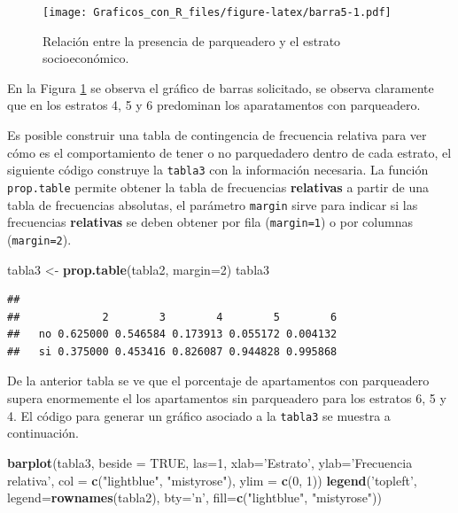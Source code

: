 \documentclass[10pt,]{krantz}
\makeatletter
\newenvironment{Shaded}{\begin{snugshade}}{\end{snugshade}}
\newcommand{\KeywordTok}[1]{\textcolor[rgb]{0.13,0.29,0.53}{\textbf{{#1}}}}
\newcommand{\DataTypeTok}[1]{\textcolor[rgb]{0.13,0.29,0.53}{{#1}}}
\newcommand{\DecValTok}[1]{\textcolor[rgb]{0.00,0.00,0.81}{{#1}}}
\newcommand{\StringTok}[1]{\textcolor[rgb]{0.31,0.60,0.02}{{#1}}}
\newcommand{\OtherTok}[1]{\textcolor[rgb]{0.56,0.35,0.01}{{#1}}}
\newcommand{\NormalTok}[1]{{#1}}
\newenvironment{kframe}{%
\medskip{}
\setlength{\fboxsep}{.8em}
 \def\at@end@of@kframe{}%
 \ifinner\ifhmode%
  \def\at@end@of@kframe{\end{minipage}}%
  \begin{minipage}{\columnwidth}%
 \fi\fi%
 \def\FrameCommand##1{\hskip\@totalleftmargin \hskip-\fboxsep
 \colorbox{shadecolor}{##1}\hskip-\fboxsep
     \hskip-\linewidth \hskip-\@totalleftmargin \hskip\columnwidth}%
 \MakeFramed {\advance\hsize-\width
   \@totalleftmargin\z@ \linewidth\hsize
   \@setminipage}}%
 {\par\unskip\endMakeFramed%
 \at@end@of@kframe}
\renewenvironment{Shaded}{\begin{kframe}}{\end{kframe}}
\makeatother
\begin{document}
\begin{figure}[htbp]
\centering
\texttt{[image: Graficos\_con\_R\_files/figure-latex/barra5-1.pdf]}
\caption{\label{fig:barra5}Relación entre la presencia de parqueadero y el
estrato socioeconómico.}
\end{figure}

En la Figura \ref{fig:barra5} se observa el gráfico de barras
solicitado, se observa claramente que en los estratos 4, 5 y 6
predominan los aparatamentos con parqueadero.

Es posible construir una tabla de contingencia de frecuencia relativa
para ver cómo es el comportamiento de tener o no parquedadero dentro de
cada estrato, el siguiente código construye la \texttt{tabla3} con la
información necesaria. La función \texttt{prop.table} permite obtener la
tabla de frecuencias \textbf{relativas} a partir de una tabla de
frecuencias absolutas, el parámetro \texttt{margin} sirve para indicar
si las frecuencias \textbf{relativas} se deben obtener por fila
(\texttt{margin=1}) o por columnas (\texttt{margin=2}).

\begin{Shaded}
\begin{Highlighting}[]
\NormalTok{tabla3 <-}\StringTok{ }\KeywordTok{prop.table}\NormalTok{(tabla2, }\DataTypeTok{margin=}\DecValTok{2}\NormalTok{)}
\NormalTok{tabla3}
\end{Highlighting}
\end{Shaded}

\begin{verbatim}
##     
##             2        3        4        5        6
##   no 0.625000 0.546584 0.173913 0.055172 0.004132
##   si 0.375000 0.453416 0.826087 0.944828 0.995868
\end{verbatim}

De la anterior tabla se ve que el porcentaje de apartamentos con
parqueadero supera enormemente el los apartamentos sin parqueadero para
los estratos 6, 5 y 4. El código para generar un gráfico asociado a la
\texttt{tabla3} se muestra a continuación.

\begin{Shaded}
\begin{Highlighting}[]
\KeywordTok{barplot}\NormalTok{(tabla3, }
        \DataTypeTok{beside =} \OtherTok{TRUE}\NormalTok{, }\DataTypeTok{las=}\DecValTok{1}\NormalTok{, }
        \DataTypeTok{xlab=}\StringTok{'Estrato'}\NormalTok{, }\DataTypeTok{ylab=}\StringTok{'Frecuencia relativa'}\NormalTok{,}
        \DataTypeTok{col =} \KeywordTok{c}\NormalTok{(}\StringTok{"lightblue"}\NormalTok{, }\StringTok{"mistyrose"}\NormalTok{),}
        \DataTypeTok{ylim =} \KeywordTok{c}\NormalTok{(}\DecValTok{0}\NormalTok{, }\DecValTok{1}\NormalTok{))}
\KeywordTok{legend}\NormalTok{(}\StringTok{'topleft'}\NormalTok{, }\DataTypeTok{legend=}\KeywordTok{rownames}\NormalTok{(tabla2), }\DataTypeTok{bty=}\StringTok{'n'}\NormalTok{,}
       \DataTypeTok{fill=}\KeywordTok{c}\NormalTok{(}\StringTok{"lightblue"}\NormalTok{, }\StringTok{"mistyrose"}\NormalTok{))}
\end{Highlighting}
\end{Shaded}
\end{document}
